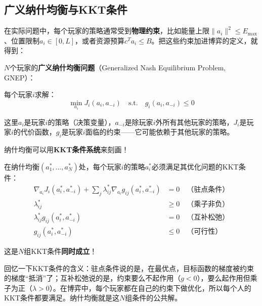 \subsection{广义纳什均衡与KKT条件}

在实际问题中，每个玩家的策略通常受到\textbf{物理约束}，比如能量上限$\|a_i\|^2 \leq E_{\max}$、位置限制$a_i \in [0, L]$，或者资源预算$c^T a_i \leq B$。把这些约束加进博弈的定义，就得到：

\begin{definition}[广义纳什均衡问题]
$N$个玩家的\textbf{广义纳什均衡问题}（Generalized Nash Equilibrium Problem, GNEP）：

每个玩家$i$求解：
\begin{equation}
    \min_{a_i} J_i(a_i, a_{-i}) \quad \text{s.t.} \quad g_i(a_i, a_{-i}) \leq 0
\end{equation}

这里$a_i$是玩家$i$的策略（决策变量），$a_{-i}$是除玩家$i$外所有其他玩家的策略，$J_i$是玩家$i$的代价函数，$g_i$是玩家$i$面临的约束——它可能依赖于其他玩家的策略。
\end{definition}

\begin{keyinsight}
纳什均衡可以用\textbf{KKT条件系统}来刻画！

在纳什均衡$(a_1^*, \ldots, a_N^*)$处，每个玩家$i$的策略$a_i^*$必须满足其优化问题的KKT条件：
\begin{align}
    \nabla_{a_i} J_i(a_i^*, a_{-i}^*) + \sum_j \lambda_{ij}^* \nabla_{a_i} g_{ij}(a_i^*, a_{-i}^*) &= 0 \quad \text{（驻点条件）} \\
    \lambda_{ij}^* &\geq 0 \quad \text{（乘子非负）} \\
    \lambda_{ij}^* g_{ij}(a_i^*, a_{-i}^*) &= 0 \quad \text{（互补松弛）} \\
    g_{ij}(a_i^*, a_{-i}^*) &\leq 0 \quad \text{（可行性）}
\end{align}

这是$N$组KKT条件\textbf{同时成立}！
\end{keyinsight}

\begin{remark}[KKT条件的物理意义]
回忆一下KKT条件的含义：驻点条件说的是，在最优点，目标函数的梯度被约束的梯度“抵消”了；互补松弛说的是，约束要么不起作用（$g < 0$），要么起作用但乘子为正（$\lambda > 0$）。在博弈中，每个玩家都在自己的约束下做优化，所以每个人的KKT条件都要满足。纳什均衡就是这$N$组条件的公共解。
\end{remark}

